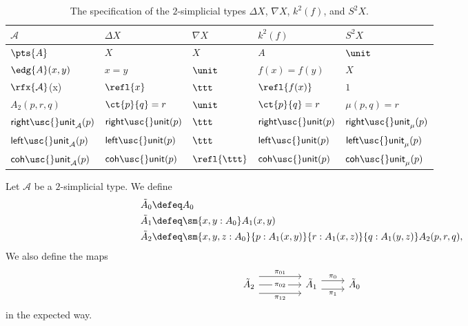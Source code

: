 \begin{table}
\centering
\caption{\label{table:stype_eg}The specification of the $2$-simplicial types $\Delta X$, $\nabla X$, $k^2(f)$, and $S^2 X$.}
\begin{tabular}{lllll}
\toprule
$\mathcal{A}$ & $\Delta X$ & $\nabla X$ & $k^2(f)$ & $S^2X$ \\
\midrule
$\pts{A}$ & $X$ & $X$ & $A$ & $\unit$  \\
$\edg{A}(x,y)$ &  $x=y$ & $\unit$ & $f(x)=f(y)$ & $X$ \\
$\rfx{\mathcal{A}}$(x) & $\refl{x}$ & $\ttt$ & $\refl{f(x)}$ & $1$  \\
$A_2(p,r,q)$ & $\ct{p}{q}=r$ & $\unit$ & $\ct{p}{q}=r$ & $\mu(p,q)=r$ \\
$\mathsf{right\usc{}unit}_{\mathcal{A}}(p)$ & $\mathsf{right\usc{}unit}(p)$ & $\ttt$ & $\mathsf{right\usc{}unit}(p)$ & $\mathsf{right\usc{}unit}_{\mu}(p)$ \\ 
$\mathsf{left\usc{}unit}_{\mathcal{A}}(p)$ & $\mathsf{left\usc{}unit}(p)$ & $\ttt$ & $\mathsf{left\usc{}unit}(p)$ & $\mathsf{left\usc{}unit}_{\mu}(p)$ \\
$\mathsf{coh\usc{}unit}_{\mathcal{A}}(p)$ & $\mathsf{coh\usc{}unit}(p)$ & $\refl{\ttt}$ & $\mathsf{coh\usc{}unit}(p)$ & $\mathsf{coh\usc{}unit}_{\mu}(p)$ \\
\bottomrule
\end{tabular}
\end{table}

\begin{defn}
Let $\mathcal{A}$ be a $2$-simplicial type. We define
\begin{align*}
\tilde{A}_0 & \defeq A_0 \\
\tilde{A}_1 & \defeq \sm{x,y:A_0} A_1(x,y) \\
\tilde{A}_2 & \defeq \sm{x,y,z:A_0}{p:A_1(x,y)}{r:A_1(x,z)}{q:A_1(y,z)} A_2(p,r,q),
\end{align*}
We also define the maps
\begin{equation*}
\begin{tikzcd}
\tilde{A}_2 \arrow[r,yshift=2ex,"\pi_{01}"] \arrow[r,"\pi_{02}" description] \arrow[r,yshift=-2ex,swap,"\pi_{12}"] &[2em] \tilde{A}_1 \arrow[r,yshift=1ex,"\pi_0"] \arrow[r,yshift=-1ex,swap,"\pi_1"] & \tilde{A}_0
\end{tikzcd}
\end{equation*}
in the expected way.
\end{defn}

